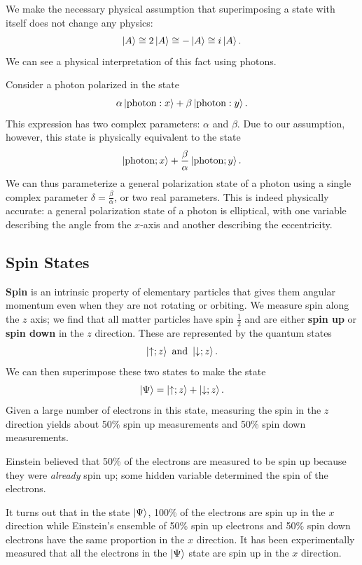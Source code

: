     We make the necessary physical assumption that superimposing a state with itself does not change any physics: $$\ket{A}\cong 2\ket{A}\cong -\ket{A}\cong i\ket{A}.$$We can see a physical interpretation of this fact using photons.

    \begin{framedexpl}
        Consider a photon polarized in the state $$\alpha\ket{\text{photon}:x}+\beta\ket{\text{photon}:y}.$$This expression has two complex parameters: $\alpha$ and $\beta$. Due to our assumption, however, this state is physically equivalent to the state $$\ket{\text{photon};x}+\frac{\beta}{\alpha}\ket{\text{photon};y}.$$We can thus parameterize a general polarization state of a photon using a single complex parameter $\delta=\frac{\beta}{\alpha}$, or two real parameters. This is indeed physically accurate: a general polarization state of a photon is elliptical, with one variable describing the angle from the $x$-axis and another describing the eccentricity.
    \end{framedexpl}

    \subsection{Spin States}\label{spin_states}

    \textbf{Spin} is an intrinsic property of elementary particles that gives them angular momentum even when they are not rotating or orbiting. We measure spin along the $z$ axis; we find that all matter particles have spin $\frac{1}{2}$ and are either \textbf{spin up} or \textbf{spin down} in the $z$ direction. These are represented by the quantum states $$\ket{\uparrow;z}\text{ and }\ket{\downarrow;z}.$$We can then superimpose these two states to make the state $$\ket{\Psi}=\ket{\uparrow;z}+\ket{\downarrow;z}.$$Given a large number of electrons in this state, measuring the spin in the $z$ direction yields about 50\% spin up measurements and 50\% spin down measurements. 

    \begin{framedrmk*}
        Einstein believed that 50\% of the electrons are measured to be spin up because they were \textit{already} spin up; some hidden variable determined the spin of the electrons.

        It turns out that in the state $\ket{\Psi}$, 100\% of the electrons are spin up in the $x$ direction while Einstein's ensemble of 50\% spin up electrons and 50\% spin down electrons have the same proportion in the $x$ direction. It has been experimentally measured that all the electrons in the $\ket{\Psi}$ state are spin up in the $x$ direction.  
    \end{framedrmk*}

